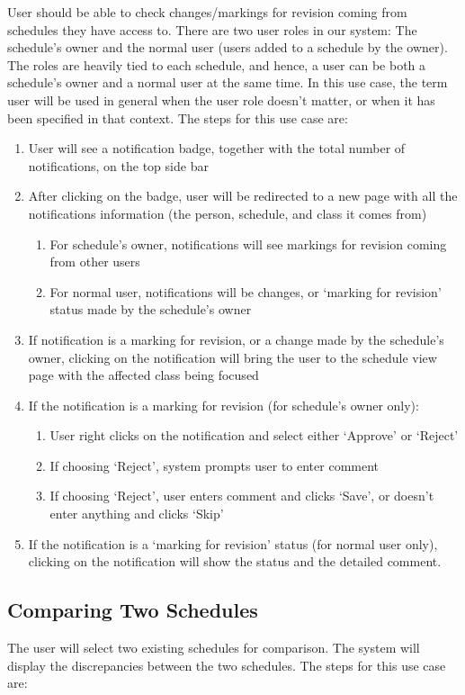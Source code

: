 \documentclass{extarticle}
\begin{document}
User should be able to check changes/markings for revision coming from schedules they have access to. There are two user roles in our system: The schedule's owner and the normal user (users added to a schedule by the owner). The roles are heavily tied to each schedule, and hence, a user can be both a schedule's owner and a normal user at the same time. In this use case, the term user will be used in general when the user role doesn't matter, or when it has been specified in that context. The steps for this use case are:

\begin{enumerate}
\item User will see a notification badge, together with the total number of notifications, on the top side bar
\item After clicking on the badge, user will be redirected to a new page with all the notifications information (the person, schedule, and class it comes from)
	\begin{enumerate}
	\item For schedule's owner, notifications will see markings for revision coming from other users
	\item For normal user, notifications will be changes, or `marking for revision' status made by the schedule's owner
	\end{enumerate}
\item If notification is a marking for revision, or a change made by the schedule's owner, clicking on the notification will bring the user to the schedule view page with the affected class being focused
\item If the notification is a marking for revision (for schedule's owner only):
	\begin{enumerate}
	\item User right clicks on the notification and select either `Approve' or `Reject'
	\item If choosing `Reject', system prompts user to enter comment
	\item If choosing `Reject', user enters comment and clicks `Save', or doesn't enter anything and clicks `Skip'
	\end{enumerate}
\item If the notification is a `marking for revision' status (for normal user only), clicking on the notification will show the status and the detailed comment.
\end{enumerate}

\subsection{Comparing Two Schedules}
The user will select two existing schedules for comparison.  The system will display the discrepancies between the
two schedules.  The steps for this use case are:
\end{document}
